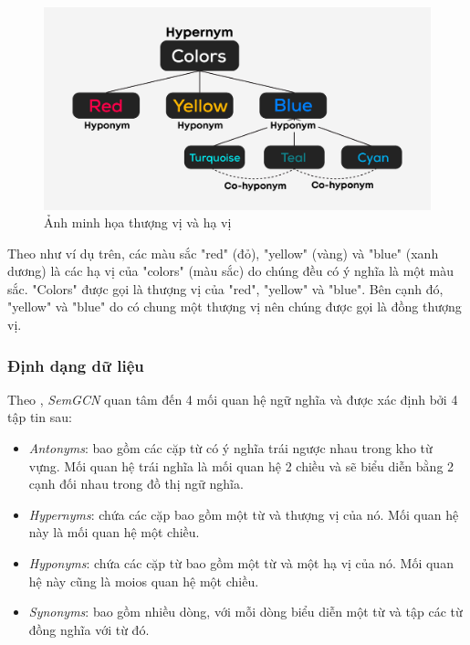 \begin{figure}[H]
    \begin{center}
        \includegraphics[scale=0.185]{images/hypernym-hyponym}
        \caption{Ảnh minh họa thượng vị và hạ vị}
        \label{fig:hypernym-hyponym}
    \end{center}
\end{figure}

Theo như ví dụ trên, các màu sắc "red" (đỏ), "yellow" (vàng) và "blue" (xanh dương) là các hạ vị của "colors" (màu sắc) do chúng đều có ý nghĩa là một màu sắc. "Colors" được gọi là thượng vị của "red", "yellow" và "blue". Bên cạnh đó, "yellow" và "blue" do có chung một thượng vị nên chúng được gọi là đồng thượng vị.


\subsubsection{Định dạng dữ liệu}

Theo \cite{github.wordgcn}, \textit{SemGCN} quan tâm đến 4 mối quan hệ ngữ nghĩa và được xác định bởi 4 tập tin sau:
\begin{itemize}
	\item \textit{Antonyms}: bao gồm các cặp từ có ý nghĩa trái ngược nhau trong kho từ vựng. Mối quan hệ trái nghĩa là mối quan hệ 2 chiều và sẽ biểu diễn bằng 2 cạnh đối nhau trong đồ thị ngữ nghĩa.
	\item \textit{Hypernyms}: chứa các cặp bao gồm một từ và thượng vị của nó. Mối quan hệ này là mối quan hệ một chiều.
	\item \textit{Hyponyms}: chứa các cặp từ bao gồm một từ và một hạ vị của nó. Mối quan hệ này cũng là moios quan hệ một chiều.
	\item \textit{Synonyms}: bao gồm nhiều dòng, với mỗi dòng biểu diễn một từ và tập các từ đồng nghĩa với từ đó.
\end{itemize}

